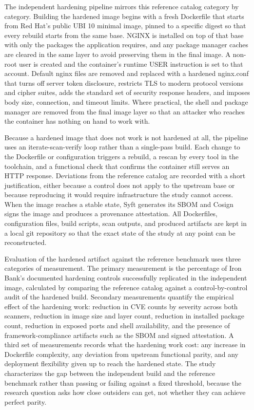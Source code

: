 \documentclass[10pt,letterpaper,twocolumn]{article}
\begin{document}
The independent hardening pipeline mirrors this reference catalog category by category. Building the hardened image begins with a fresh Dockerfile that starts from Red Hat's public UBI 10 minimal image, pinned to a specific digest so that every rebuild starts from the same base. NGINX is installed on top of that base with only the packages the application requires, and any package manager caches are cleared in the same layer to avoid preserving them in the final image. A non-root user is created and the container's runtime USER instruction is set to that account. Default nginx files are removed and replaced with a hardened nginx.conf that turns off server token disclosure, restricts TLS to modern protocol versions and cipher suites, adds the standard set of security response headers, and imposes body size, connection, and timeout limits. Where practical, the shell and package manager are removed from the final image layer so that an attacker who reaches the container has nothing on hand to work with.

Because a hardened image that does not work is not hardened at all, the pipeline uses an iterate-scan-verify loop rather than a single-pass build. Each change to the Dockerfile or configuration triggers a rebuild, a rescan by every tool in the toolchain, and a functional check that confirms the container still serves an HTTP response. Deviations from the reference catalog are recorded with a short justification, either because a control does not apply to the upstream base or because reproducing it would require infrastructure the study cannot access. When the image reaches a stable state, Syft generates its SBOM and Cosign signs the image and produces a provenance attestation. All Dockerfiles, configuration files, build scripts, scan outputs, and produced artifacts are kept in a local git repository so that the exact state of the study at any point can be reconstructed.

Evaluation of the hardened artifact against the reference benchmark uses three categories of measurement. The primary measurement is the percentage of Iron Bank's documented hardening controls successfully replicated in the independent image, calculated by comparing the reference catalog against a control-by-control audit of the hardened build. Secondary measurements quantify the empirical effect of the hardening work: reduction in CVE counts by severity across both scanners, reduction in image size and layer count, reduction in installed package count, reduction in exposed ports and shell availability, and the presence of framework-compliance artifacts such as the SBOM and signed attestation. A third set of measurements records what the hardening work cost: any increase in Dockerfile complexity, any deviation from upstream functional parity, and any deployment flexibility given up to reach the hardened state. The study characterizes the gap between the independent build and the reference benchmark rather than passing or failing against a fixed threshold, because the research question asks how close outsiders can get, not whether they can achieve perfect parity.
\end{document}
